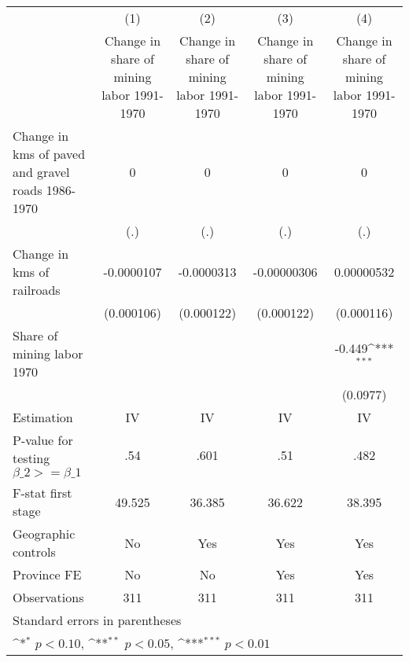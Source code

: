 {
\def\sym#1{\ifmmode^{#1}\else\(^{#1}\)\fi}
\begin{tabular}{l*{4}{c}}
\hline\hline
                    &\multicolumn{1}{c}{(1)}&\multicolumn{1}{c}{(2)}&\multicolumn{1}{c}{(3)}&\multicolumn{1}{c}{(4)}\\
                    &\multicolumn{1}{c}{Change in share of mining labor 1991-1970}&\multicolumn{1}{c}{Change in share of mining labor 1991-1970}&\multicolumn{1}{c}{Change in share of mining labor 1991-1970}&\multicolumn{1}{c}{Change in share of mining labor 1991-1970}\\
\hline
Change in kms of paved and gravel roads 1986-1970&           0         &           0         &           0         &           0         \\
                    &         (.)         &         (.)         &         (.)         &         (.)         \\
[1em]
Change in kms of railroads&  -0.0000107         &  -0.0000313         & -0.00000306         &  0.00000532         \\
                    &  (0.000106)         &  (0.000122)         &  (0.000122)         &  (0.000116)         \\
[1em]
Share of mining labor 1970&                     &                     &                     &      -0.449\sym{***}\\
                    &                     &                     &                     &    (0.0977)         \\
\hline
Estimation          &          IV         &          IV         &          IV         &          IV         \\
P-value for testing $\beta\_2 >= \beta\_1$&         .54         &        .601         &         .51         &        .482         \\
F-stat first stage  &      49.525         &      36.385         &      36.622         &      38.395         \\
Geographic controls &          No         &         Yes         &         Yes         &         Yes         \\
Province FE         &          No         &          No         &         Yes         &         Yes         \\
Observations        &         311         &         311         &         311         &         311         \\
\hline\hline
\multicolumn{5}{l}{\footnotesize Standard errors in parentheses}\\
\multicolumn{5}{l}{\footnotesize \sym{*} \(p<0.10\), \sym{**} \(p<0.05\), \sym{***} \(p<0.01\)}\\
\end{tabular}
}
